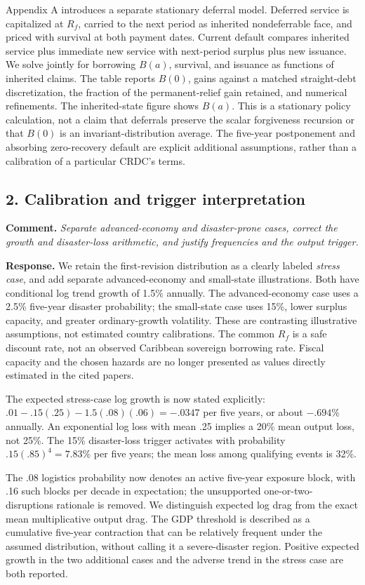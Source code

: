 \documentclass[11pt]{article}
\newcommand{\comment}[1]{\par\medskip\Needspace{7\baselineskip}\noindent\textbf{Comment.} \emph{#1}\par\smallskip}
\newcommand{\response}{\noindent\textbf{Response.} }
\begin{document}
Appendix A introduces a separate stationary deferral model. Deferred service is capitalized at $R_f$, carried to the next period as inherited nondeferrable face, and priced with survival at both payment dates. Current default compares inherited service plus immediate new service with next-period surplus plus new issuance. We solve jointly for borrowing $B(a)$, survival, and issuance as functions of inherited claims. The table reports $B(0)$, gains against a matched straight-debt discretization, the fraction of the permanent-relief gain retained, and numerical refinements. The inherited-state figure shows $B(a)$. This is a stationary policy calculation, not a claim that deferrals preserve the scalar forgiveness recursion or that $B(0)$ is an invariant-distribution average. The five-year postponement and absorbing zero-recovery default are explicit additional assumptions, rather than a calibration of a particular CRDC's terms.

\subsection*{2. Calibration and trigger interpretation}
\comment{Separate advanced-economy and disaster-prone cases, correct the growth and disaster-loss arithmetic, and justify frequencies and the output trigger.}
\response We retain the first-revision distribution as a clearly labeled \emph{stress case}, and add separate advanced-economy and small-state illustrations. Both have conditional log trend growth of 1.5\% annually. The advanced-economy case uses a 2.5\% five-year disaster probability; the small-state case uses 15\%, lower surplus capacity, and greater ordinary-growth volatility. These are contrasting illustrative assumptions, not estimated country calibrations. The common $R_f$ is a safe discount rate, not an observed Caribbean sovereign borrowing rate. Fiscal capacity and the chosen hazards are no longer presented as values directly estimated in the cited papers.

The expected stress-case log growth is now stated explicitly: $.01-.15(.25)-1.5(.08)(.06)=-.0347$ per five years, or about $-.694\%$ annually. An exponential log loss with mean .25 implies a 20\% mean output loss, not 25\%. The 15\% disaster-loss trigger activates with probability $.15(.85)^4=7.83\%$ per five years; the mean loss among qualifying events is 32\%.

The .08 logistics probability now denotes an active five-year exposure block, with .16 such blocks per decade in expectation; the unsupported one-or-two-disruptions rationale is removed. We distinguish expected log drag from the exact mean multiplicative output drag. The GDP threshold is described as a cumulative five-year contraction that can be relatively frequent under the assumed distribution, without calling it a severe-disaster region. Positive expected growth in the two additional cases and the adverse trend in the stress case are both reported.
\end{document}
